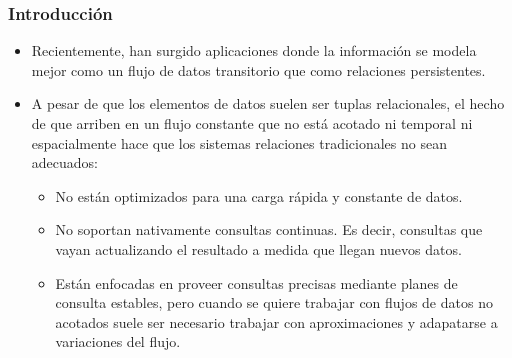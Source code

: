 
\begin{frame}
\frametitle{Introducción}
\begin{itemize}

\item Recientemente, han surgido aplicaciones donde la información se modela mejor como un flujo de datos transitorio que como relaciones persistentes.
\item A pesar de que los elementos de datos suelen ser tuplas relacionales, el hecho de que arriben en un flujo constante que no está acotado ni temporal ni espacialmente hace que los sistemas relaciones tradicionales no sean adecuados:
\begin{itemize}
\item No están optimizados para una carga rápida y constante de datos.
\item No soportan nativamente consultas continuas. Es decir, consultas que vayan actualizando el resultado a medida que llegan nuevos datos.
\item Están enfocadas en proveer consultas precisas mediante planes de consulta estables, pero cuando se quiere trabajar con flujos de datos no acotados suele ser necesario trabajar con aproximaciones y adapatarse a variaciones del flujo.
\end{itemize}
\end{itemize}
\end{frame}

